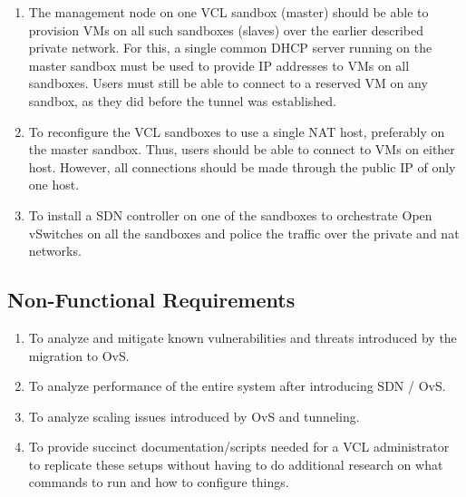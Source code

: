 \documentclass[12pt]{extarticle}
\begin{document}
\begin{enumerate}
    \item The management node on one VCL sandbox (master) should be able to provision VMs on all such sandboxes (slaves) over the earlier described private network. For this, a single common DHCP server running on the master sandbox must be used to provide IP addresses to VMs on all sandboxes. Users must still be able to connect to a reserved VM on any sandbox, as they did before the tunnel was established.
    
    \item To reconfigure the VCL sandboxes to use a single NAT host, preferably on the master sandbox. Thus, users should be able to connect to VMs on either host. However, all connections should be made through the public IP of only one host.

    
    
    

        
    \item To install a SDN controller on one of the sandboxes to orchestrate Open vSwitches on all the sandboxes and police the traffic over the private and nat networks.
    
\end{enumerate}

\subsection{Non-Functional Requirements}
    \begin{enumerate}
        \item To analyze and mitigate known vulnerabilities and threats introduced by the migration to OvS.
        \item To analyze performance of the entire system after introducing SDN / OvS.
        \item To analyze scaling issues introduced by OvS and tunneling.
        \item To provide succinct documentation/scripts needed for a VCL administrator to replicate these setups without having to do additional research on what commands to run and how to configure things. 
    
    \end{enumerate}
    
\end{document}
